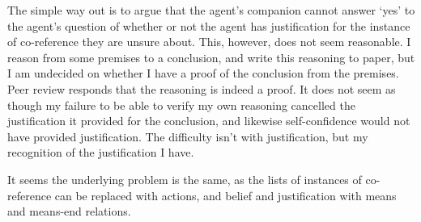 \documentclass[10pt]{article}
\begin{document}
The simple way out is to argue that the agent's companion cannot answer `yes' to the agent's question of whether or not the agent has justification for the instance of co-reference they are unsure about.
This, however, does not seem reasonable.
I reason from some premises to a conclusion, and write this reasoning to paper, but I am undecided on whether I have a proof of the conclusion from the premises.
Peer review responds that the reasoning is indeed a proof.
It does not seem as though my failure to be able to verify my own reasoning cancelled the justification it provided for the conclusion, and likewise self-confidence would not have provided justification.
The difficulty isn't with justification, but my recognition of the justification I have.

It seems the underlying problem is the same, as the lists of instances of co-reference can be replaced with actions, and belief and justification with means and means-end relations.

\newpage

\printbibliography
\end{document}
